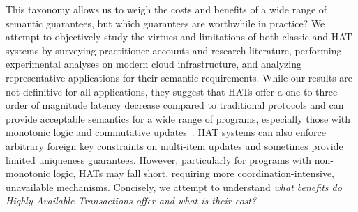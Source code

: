 This taxonomy allows us to weigh the costs and benefits of a wide
range of semantic guarantees, but which guarantees are worthwhile in
practice? We attempt to objectively study the virtues and limitations
of both classic and HAT systems by surveying practitioner accounts and
research literature, performing experimental analyses on modern cloud
infrastructure, and analyzing representative applications for their
semantic requirements. While our results are not definitive for all
applications, they suggest that HATs offer a one to three order of
magnitude latency decrease compared to traditional protocols and can
provide acceptable semantics for a wide range of programs, especially
those with monotonic logic and commutative updates~\cite{calm, blooml,
  crdt}. HAT systems can also enforce arbitrary foreign key
constraints on multi-item updates and sometimes provide limited
uniqueness guarantees. However, particularly for programs with
non-monotonic logic, HATs may fall short, requiring more
coordination-intensive, unavailable mechanisms. Concisely, we attempt
to understand \textit{what benefits do Highly Available Transactions
  offer and what is their cost?}




